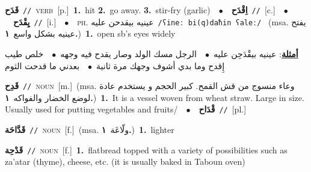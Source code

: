 \documentclass[10pt,a4paper,twoside]{article} %
\begin{document}
\begin{multicols}{2}
{\setlength\topsep{0pt}\textbf{\foreignlanguage{arabic}{قَدَح}}\ {\color{gray}\texttt{//}\color{black}}\ \textsc{verb}\ [p.]\ \textbf{1.}~hit  \textbf{2.}~go away.  \textbf{3.}~stir-fry (garlic)\ \ $\bullet$\ \ \setlength\topsep{0pt}\textbf{\foreignlanguage{arabic}{اِقْدَح}}\ {\color{gray}\texttt{//}\color{black}}\ [c.]\ \ $\bullet$\ \ \setlength\topsep{0pt}\textbf{\foreignlanguage{arabic}{يِقْدَح}}\ {\color{gray}\texttt{//}\color{black}}\ [i.]\ \ $\bullet$\ \ \textsc{ph.} \color{gray} \foreignlanguage{arabic}{عينيه بيقدحن عليه}\color{black}\ {\color{gray}\texttt{/{\sffamily ʕineː bi(q)daħin ʕaleː}/}\color{black}}\ \color{gray} (msa. \foreignlanguage{arabic}{يفتح عينيه بشكل واسع}~\foreignlanguage{arabic}{\textbf{١.}})\color{black}\ \textbf{1.}~open sb's eyes widely\  \begin{flushright}\color{gray}\foreignlanguage{arabic}{\textbf{\underline{\foreignlanguage{arabic}{أمثلة}}}: عينيه بيقْدَحِن عليه\ $\bullet$\ \  الرجل مسك الولد وصار يقدح فيه وجهه\ $\bullet$\ \  خلص طيب إِقدح وما بدي أشوف وجهك مرة ثانية\ $\bullet$\ \  بعدني ما قدحت الثوم}\end{flushright}\color{black}} \vspace{2mm}

{\setlength\topsep{0pt}\textbf{\foreignlanguage{arabic}{قَدِح}}\ {\color{gray}\texttt{//}\color{black}}\ \textsc{noun}\ [m.]\ \color{gray}(msa. \foreignlanguage{arabic}{وعاء منسوج من قش القمح. كبير الحجم و يستخدم عادة لوضع الخضار والفواكه}~\foreignlanguage{arabic}{\textbf{١.}})\color{black}\ \textbf{1.}~It is a vessel woven from wheat straw. Large in size. Usually used for putting vegetables and fruits/\ \ $\bullet$\ \ \setlength\topsep{0pt}\textbf{\foreignlanguage{arabic}{قْدَاح}}\ {\color{gray}\texttt{//}\color{black}}\ [pl.]\ } \vspace{2mm}

{\setlength\topsep{0pt}\textbf{\foreignlanguage{arabic}{قَدَّاحَة}}\ {\color{gray}\texttt{//}\color{black}}\ \textsc{noun}\ [f.]\ \color{gray}(msa. \foreignlanguage{arabic}{ولّاعَة}~\foreignlanguage{arabic}{\textbf{١.}})\color{black}\ \textbf{1.}~lighter\ } \vspace{2mm}

{\setlength\topsep{0pt}\textbf{\foreignlanguage{arabic}{قَدْحِة}}\ {\color{gray}\texttt{//}\color{black}}\ \textsc{noun}\ [f.]\ \textbf{1.}~flatbread topped with a variety of possibilities such as za'atar (thyme), cheese, etc. (it is usually baked in Taboun oven)\ } \vspace{2mm}


\end{multicols}
\end{document}
